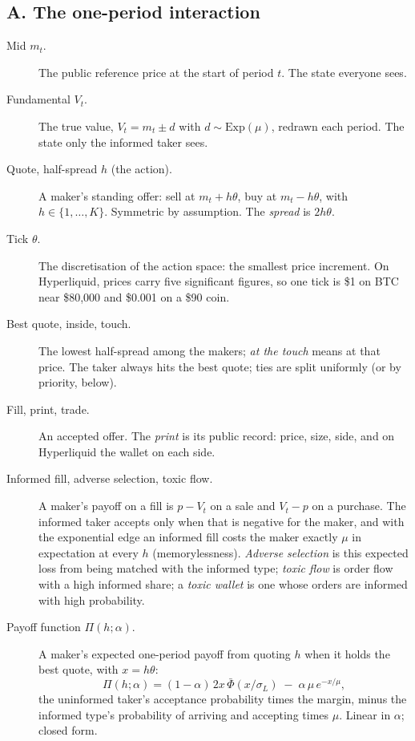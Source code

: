 \subsection*{A. The one-period interaction}
\begin{description}
\item[Mid $m_t$.] The public reference price at the start of period $t$. The state everyone sees.
\item[Fundamental $V_t$.] The true value, $V_t=m_t\pm d$ with $d\sim\mathrm{Exp}(\mu)$, redrawn each period. The state only the informed taker sees.
\item[Quote, half-spread $h$ (the action).] A maker's standing offer: sell at $m_t+h\theta$, buy at $m_t-h\theta$, with $h\in\{1,\dots,K\}$. Symmetric by assumption. The \emph{spread} is $2h\theta$.
\item[Tick $\theta$.] The discretisation of the action space: the smallest price increment. On Hyperliquid, prices carry five significant figures, so one tick is \$1 on BTC near \$80{,}000 and \$0.001 on a \$90 coin.
\item[Best quote, inside, touch.] The lowest half-spread among the makers; \emph{at the touch} means at that price. The taker always hits the best quote; ties are split uniformly (or by priority, below).
\item[Fill, print, trade.] An accepted offer. The \emph{print} is its public record: price, size, side, and on Hyperliquid the wallet on each side.
\item[Informed fill, adverse selection, toxic flow.] A maker's payoff on a fill is $p-V_t$ on a sale and $V_t-p$ on a purchase. The informed taker accepts only when that is negative for the maker, and with the exponential edge an informed fill costs the maker exactly $\mu$ in expectation at every $h$ (memorylessness). \emph{Adverse selection} is this expected loss from being matched with the informed type; \emph{toxic flow} is order flow with a high informed share; a \emph{toxic wallet} is one whose orders are informed with high probability.
\item[Payoff function $\Pi(h;\alpha)$.] A maker's expected one-period payoff from quoting $h$ when it holds the best quote, with $x=h\theta$:
\[
\Pi(h;\alpha)=(1-\alpha)\,2x\,\bar\Phi(x/\sigma_L)\;-\;\alpha\,\mu\,e^{-x/\mu},
\]
the uninformed taker's acceptance probability times the margin, minus the informed type's probability of arriving and accepting times $\mu$. Linear in $\alpha$; closed form.
\end{description}

